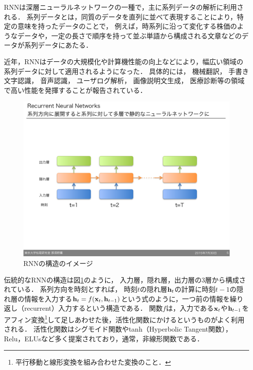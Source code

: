 RNNは深層ニューラルネットワークの一種で，主に系列データの解析に利用される．
系列データとは，同質のデータを直列に並べて表現することにより，特定の意味を持ったデータのことで，
例えば，時系列に沿って変化する株価のようなデータや，一定の長さで順序を持って並ぶ単語から構成される文章などのデータが系列データにあたる．

近年，RNNはデータの大規模化や計算機性能の向上などにより，幅広い領域の系列データに対して適用されるようになった．
具体的には，
機械翻訳\cite{sutskever2014sequence, dong2015multi}，
手書き文字認識\cite{graves2009offline,louradour2014curriculum}，
音声認識\cite{hinton2012deep,bahdanau2015end}，
ユーザログ解析\cite{hidasi2015session}，
画像説明文生成\cite{xu2015show,vinyals2014show}，
医療診断\cite{choi2015doctor,lipton2015learning}等の領域で高い性能を発揮することが報告されている．

\begin{figure}[htb]
\begin{center}
\includegraphics[width=350pt]{./img/RNN.pdf}
\end{center}
\caption{RNNの構造のイメージ}
\label{fig:RNN}
\end{figure}
伝統的なRNNの構造は図\ref{fig:RNN}のように，
入力層，隠れ層，出力層の3層から構成されている．
系列方向を時刻とすれば，
時刻$t$の隠れ層${\bf h}_t$の計算に時刻$t-1$の隠れ層の情報を入力する${\bf h}_t = f({\bf x}_t, {\bf h}_{t-1})$という式のように，一つ前の情報を繰り返し（recurrent）入力するという構造である．
関数$f$は，入力である${\bf x}_t$や${\bf h}_{t-1}$をアフィン変換\footnote{平行移動と線形変換を組み合わせた変換のこと．}して足しあわせた後，活性化関数にかけるというものがよく利用される．
活性化関数はシグモイド関数やtanh（Hyperbolic Tangent関数），Relu\cite{nair2010rectified}，ELUs\cite{clevert2015fast}など多く提案されており，通常，非線形関数である．



